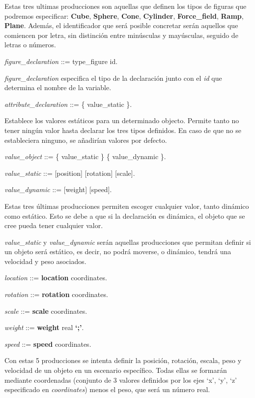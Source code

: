 \documentclass[12pt]{article}
\begin{document}
Estas tres ultimas producciones son aquellas que definen los tipos de figuras que podremos especificar: \textbf{Cube}, \textbf{Sphere}, \textbf{Cone}, \textbf{Cylinder}, \textbf{Force\_field}, \textbf{Ramp}, \textbf{Plane}. Además, el identificador que será posible concretar serán aquellos que comiencen por letra, sin distinción entre minúsculas y mayúsculas, seguido de letras o números.

\noindent \textit{figure\_declaration} ::= type\_figure id.

\textit{figure\_declaration} especifica el tipo de la declaración junto con el \textit{id} que determina el nombre de la variable.

\noindent \textit{attribute\_declaration} ::= \{ value\_static \}.

Establece los valores estáticos para un determinado objecto. Permite tanto no tener ningún valor hasta declarar los tres tipos definidos. En caso de que no se estableciera ninguno, se añadirían valores por defecto.

\noindent \textit{value\_object} ::= \{ value\_static \} \textbar\space \{ value\_dynamic \}.

\noindent \textit{value\_static} ::= [position] [rotation] [scale].

\noindent \textit{value\_dynamic} ::= [weight] [speed].

Estas tres últimas producciones permiten escoger cualquier valor, tanto dinámico como estático. Esto se debe a que si la declaración
es dinámica, el objeto que se cree pueda tener cualquier valor.

\textit{value\_static} y \textit{value\_dynamic} serán aquellas producciones que permitan definir si un objeto será estático, es decir, no podrá moverse, o dinámico, tendrá una velocidad y peso asociados.

\noindent \textit{location} ::= \textbf{location} coordinates.

\noindent \textit{rotation} ::= \textbf{rotation} coordinates.

\noindent \textit{scale} ::=  \textbf{scale} coordinates.

\noindent \textit{weight} ::= \textbf{weight} real \textbf{`;'}.

\noindent \textit{speed} ::= \textbf{speed} coordinates.

Con estas 5 producciones se intenta definir la posición, rotación, escala, peso y velocidad de un objeto en un escenario específico. Todas ellas se formarán mediante coordenadas (conjunto de 3 valores definidos por los ejes `x', `y', `z' especificado en \textit{coordinates}) menos el peso, que será un número real.
\end{document}
